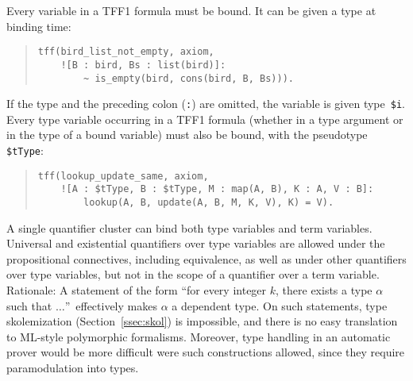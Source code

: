 Every variable in a TFF1 formula must be bound. It can be given a type at
binding time:
\begin{quote}
\begin{verbatim}
tff(bird_list_not_empty, axiom,
    ![B : bird, Bs : list(bird)]:
        ~ is_empty(bird, cons(bird, B, Bs))).
\end{verbatim}
\end{quote}
If the type and the preceding colon ({\tt :}) are omitted, the variable is given
type~{\tt\$i}. Every type variable occurring in a TFF1 formula
(whether in a type argument or in the type of a bound variable)
must also be bound, with the pseudotype {\tt\$tType}:
\begin{quote}
\begin{verbatim}
tff(lookup_update_same, axiom,
    ![A : $tType, B : $tType, M : map(A, B), K : A, V : B]:
        lookup(A, B, update(A, B, M, K, V), K) = V).
\end{verbatim}
\end{quote}

\pagebreak[2] %

A single quantifier cluster can bind both type variables and term variables.
%
Universal and existential quantifiers over type variables are allowed under the
propositional connectives, including equivalence, as well as under other
quantifiers over type variables, but not in the scope of a quantifier over a
term variable.
Rationale: A statement of the form ``for every integer $k$, there exists a type
$\alpha$ such that $\ldots$''\ effectively makes $\alpha$ a dependent type.
On such statements, type skolemization (Section~\ref{ssec:skol}) is impossible,
and there is no easy translation to ML-style polymorphic formalisms.
Moreover, type handling in an automatic prover would be more difficult were
such constructions allowed, since they require paramodulation into types.

